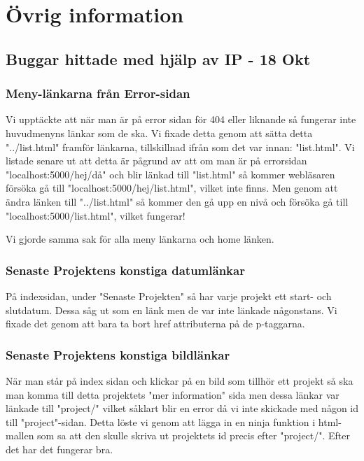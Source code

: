\documentclass{TDP003mall}
\begin{document}
    
\newpage
\section{Övrig information}

    \subsection{Buggar hittade med hjälp av IP - 18 Okt}

        \subsubsection*{Meny-länkarna från Error-sidan}
        Vi upptäckte att när man är på error sidan för 404 eller liknande så fungerar inte huvudmenyns länkar som de ska. Vi fixade detta genom att sätta detta "../list.html" framför länkarna, tillskillnad ifrån som det var innan: "list.html". Vi listade senare ut att detta är pågrund av att om man är på errorsidan "localhost:5000/hej/då" och blir länkad till "list.html" så kommer webläsaren försöka gå till "localhost:5000/hej/list.html", vilket inte finns. Men genom att ändra länken till "../list.html" så kommer den gå upp en nivå och försöka gå till "localhost:5000/list.html", vilket fungerar!
        
        Vi gjorde samma sak för alla meny länkarna och home länken.
        
        \subsubsection*{Senaste Projektens konstiga datumlänkar}
        På indexsidan, under "Senaste Projekten" så har varje projekt ett start- och slutdatum. Dessa såg ut som en länk men de var inte länkade någonstans. Vi fixade det genom att bara ta bort href attributerna på de p-taggarna.
    
        \subsubsection*{Senaste Projektens konstiga bildlänkar}
        När man står på index sidan och klickar på en bild som tillhör ett projekt så ska man komma till detta projektets "mer information" sida men dessa länkar var länkade till "project/" vilket såklart blir en error då vi inte skickade med någon id till "project"-sidan. Detta löste vi genom att lägga in en ninja funktion i html-mallen som sa att den skulle skriva ut projektets id precis efter "project/". Efter det har det fungerar bra.
        
\end{document}
